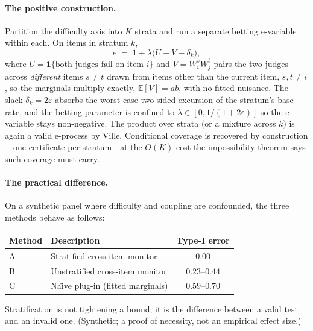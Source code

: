 \documentclass[11pt,a4paper]{article}
\begin{document}
\paragraph{The positive construction.}
Partition the difficulty axis into $K$ strata and run a separate betting e-variable within
each.  On items in stratum $k$,
\[
  e \;=\; 1 + \lambda\bigl(U - V - \delta_k\bigr),
\]
where $U = \mathbf{1}\{\text{both judges fail on item }i\}$ and $V = W_i^s W_j^t$ pairs the two
judges across \emph{different} items $s \neq t$ drawn from items other than the current item,
$s, t \neq i$, so the marginals multiply exactly,
$\mathbb{E}[V] = ab$, with no fitted nuisance.  The slack $\delta_k = 2\varepsilon$ absorbs the
worst-case two-sided excursion of the stratum's base rate, and the betting parameter is confined
to $\lambda \in [0, 1/(1+2\varepsilon)]$ so the e-variable stays non-negative.  The product
over strata (or a mixture across $k$) is again a valid e-process by Ville.  Conditional
coverage is recovered by construction---one certificate per stratum---at the $O(K)$ cost the
impossibility theorem says such coverage must carry.

\paragraph{The practical difference.}
On a synthetic panel where difficulty and coupling are confounded, the three methods behave
as follows:

\begin{center}
\begin{tabular}{llc}
\toprule
Method & Description & Type-I error \\
\midrule
A & Stratified cross-item monitor & $0.00$ \\
B & Unstratified cross-item monitor & $0.23$--$0.44$ \\
C & Na\"{\i}ve plug-in (fitted marginals) & $0.59$--$0.70$ \\
\bottomrule
\end{tabular}
\end{center}

Stratification is not tightening a bound; it is the difference between a valid test and an
invalid one.  (Synthetic; a proof of necessity, not an empirical effect size.)
\end{document}
